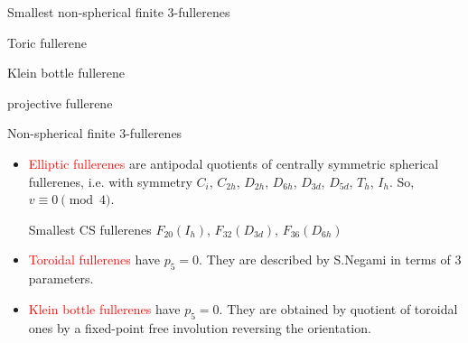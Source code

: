 \documentclass[%
pdf,
colorBG,
slideColor,
]{prosper}
\begin{document}
\begin{slide}{Smallest non-spherical finite $3$-fullerenes}
\begin{center}
\begin{minipage}[b]{3.7cm}
\centering
{}\par
Toric fullerene
\end{minipage}
\begin{minipage}[b]{3.7cm}
\centering
{}\par
Klein bottle fullerene
\end{minipage}
\begin{minipage}[b]{3.7cm}
\centering
{}\par
projective fullerene
\end{minipage}
\end{center}
\end{slide}



\begin{slide}{Non-spherical finite $3$-fullerenes}
\begin{itemize}
\item \textcolor{red}{Elliptic fullerenes} are antipodal quotients of 
centrally
symmetric spherical fullerenes, i.e. with symmetry $C_i$,
$C_{2h}$, $D_{2h}$, $D_{6h}$, $D_{3d}$, $D_{5d}$, $T_h$, $I_h$.
So, $v\equiv 0\pmod 4$. \par
Smallest CS fullerenes $F_{20}(I_h)$, $F_{32}(D_{3d})$, $F_{36}(D_{6h})$
\item \textcolor{red}{Toroidal fullerenes} have $p_5=0$.
They are described by S.Negami in terms of $3$ parameters.
\item \textcolor{red}{Klein bottle fullerenes} have $p_5=0$.
They are obtained by quotient of toroidal ones by a fixed-point free
involution reversing the orientation.
\end{itemize}
\end{slide}
\end{document}
